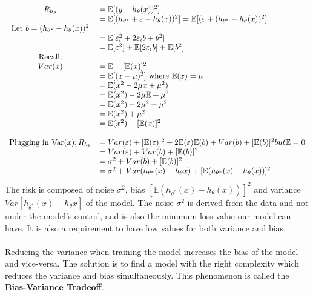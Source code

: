 \documentclass[12pt,a4paper,titlepage,landscape]{book}
\begin{document}
	\begin{equation}
	\begin{array}{cl}
		R_{h_\theta} &= \mathbb{E}[(y-h_\theta(x))^2] \\
		&= \mathbb{E}[(h_{\theta^*} + \varepsilon -h_{\theta}(x))^2] =
		\mathbb{E}[(\varepsilon + (h_{\theta^*}  -h_{\theta}(x))^2] \\
		\text{Let}~b = (h_{\theta^*}  -h_{\theta}(x))^2 \\
		&= \mathbb{E}[\varepsilon_i^2 + 2\varepsilon_i{b} + b^2] \\
		&= \mathbb{E}[\varepsilon^2] + \mathbb{E}[2\varepsilon_i{b}] + \mathbb{E}[b^2] \\
		\linebreak
		\text{Recall;} \\
		Var(x) &= \mathbb{E} - [\mathbb{E}(x)]^2 \\
		&= \mathbb{E}[(x - \mu)^2] ~ \text{where} ~ \mathbb{E}(x) = \mu \\
		&= \mathbb{E}(x^2 -2\mu{x}+\mu^2) \\
		&= \mathbb{E}(x^2)-2\mu\mathbb{E} + \mu^2 \\
		&= \mathbb{E}(x^2)-2\mu^2 + \mu^2 \\
		&= \mathbb{E}(x^2) + \mu^2 \\
		&= \mathbb{E}(x^2)-[\mathbb{E}(x)]^2 \\\\
		\text{Plugging in Var}(x);
		R_{h_\theta} &= Var(\varepsilon) + [\mathbb{E}(\varepsilon)]^2 + 2\mathbb{E}(\varepsilon)\mathbb{E}(b) + Var(b) + [\mathbb{E}(b)]^2 but \mathbb{E} = 0 \\
		&= Var(\varepsilon) + Var(b) + [\mathbb{E}(b)]^2 \\
		&= \sigma^2 + Var(b) + [\mathbb{E}(b)]^2 \\
		&= \sigma^2 + Var(h_{\theta^*}(x) - h_\theta{x}) + [\mathbb{E}(h_{\theta^*}(x) - h_\theta(x))]^2
				
	\end{array}
	\end{equation}
	The risk is composed of noise $\sigma^2$, bias
	$[\mathbb{E}(h_{\theta^*}(x) - h_\theta(x))]^2$ and variance $Var[h_{\theta^*}(x) - h_\theta{x}]$ of the model. The noise $\sigma^2$ is derived from the data and not under the model's control, and is also the minimum loss value our model can have. It is also a requirement to have low values for both variance and bias. \\\\
	Reducing the variance when training the model increases the bias of the model and vice-versa. The solution is to find a model with the right complexity which reduces the variance and bias simultaneously. This phenomenon is called the \textbf{Bias-Variance Tradeoff}.
	
\end{document}
